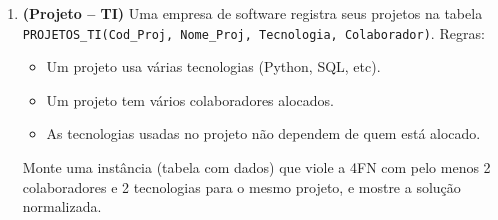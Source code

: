 \documentclass[12pt]{article}
\begin{document}
\begin{enumerate}[label=\textbf{Questão \arabic*:}, leftmargin=*]
\begin{center}
  \end{center}

  Apresente o modelo relacional final na 4FN, identificando claramente as chaves primárias e estrangeiras. Explique por que manter todos em uma única tabela é ineficiente.
  \begin{resposta}
  \end{resposta}

  \vspace{0.4cm}

  \item \textbf{(Projeto -- TI)} Uma empresa de software registra seus projetos na tabela \texttt{PROJETOS\_TI(Cod\_Proj, Nome\_Proj, Tecnologia, Colaborador)}. 
  Regras: 
  \begin{itemize}
      \item Um projeto usa várias tecnologias (Python, SQL, etc).
      \item Um projeto tem vários colaboradores alocados.
      \item As tecnologias usadas no projeto não dependem de quem está alocado.
  \end{itemize}

  \begin{center}
  \end{center}

  Monte uma instância (tabela com dados) que viole a 4FN com pelo menos 2 colaboradores e 2 tecnologias para o mesmo projeto, e mostre a solução normalizada.
  \begin{resposta}
  \end{resposta}

  \vspace{0.4cm}


\end{enumerate}
\end{document}
